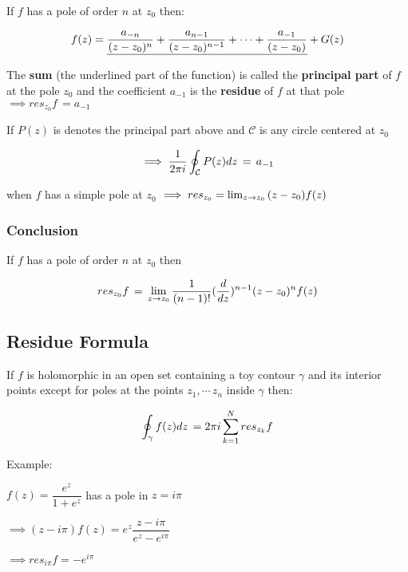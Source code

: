 \documentclass[11pt]{article}
\begin{document}
If \(f\) has a pole of order \(n\) at \(z_{0}\) then:

\[\large f(z)=\underline{\frac{a_{-n}}{(z-z_{0})^{n}}+\frac{a_{n-1}}{(z-z_{0})^{n-1}}+\cdots + \frac{a_{-1}}{(z-z_{0})}} + G(z)\]

The \textbf{sum} (the underlined part of the function) is called the
\textbf{principal part} of \(f\) at the pole \(z_{0}\) and the
coefficient \(a_{-1}\) is the \textbf{residue} of \(f\) at that pole
\(\implies res_{z_{0}}f\,=a_{-1}\)

If \(P(z)\) is denotes the principal part above and \(\mathcal{C}\) is
any circle centered at \(z_{0}\)

\[\implies \large \dfrac{1}{2\pi i}\oint_{\mathcal{C}}{P(z)dz}\,=\,a_{-1}\]

when \(f\) has a simple pole at \(z_{0}\)
\(\large \implies res_{z_{0}}=\lim_{z\to z_{0}}{(z-z_{0})}f(z)\)

\subsubsection{Conclusion}\label{conclusion}

If \(f\) has a pole of order \(n\) at \(z_{0}\) then

\[\Large res_{z_{0}}f\,=\,\lim_{z\to z_{0}} \dfrac{1}{(n-1)!}(\frac{d}{dz})^{n-1}(z-z_{0})^{n}f(z)\]

    \subsection{Residue Formula}\label{residue-formula}

If \(f\) is holomorphic in an open set containing a toy contour
\(\gamma\) and its interior points except for poles at the points
\(z_{1},\cdots\,z_{n}\) inside \(\gamma\) then:

\[\Large \oint_{\gamma}f(z)dz\,=2\pi i\sum_{k=1}^{N}res_{z_{k}}f\]

Example:

\(f(z)=\dfrac{e^{z}}{1+e^{z}}\) has a pole in \(z=i\pi\)

\(\implies (z-i\pi)f(z)=e^{z}\dfrac{z-i\pi}{e^{z}-e^{i\pi}}\)

\(\implies res_{i\pi}f=-e^{i\pi}\)
\end{document}
